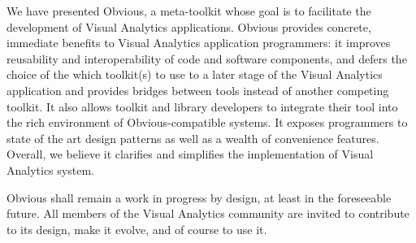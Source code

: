 
We have presented Obvious, a meta-toolkit whose goal is to facilitate
the development of Visual Analytics applications.
Obvious provides concrete, immediate benefits to Visual Analytics
application programmers: it improves reusability and interoperability
of code and software components, and defers the choice of the which
toolkit(s) to use to a later stage of the Visual Analytics application
and provides bridges between tools instead of another competing
toolkit.  It also allows toolkit and library developers to integrate
their tool into the rich environment of Obvious-compatible systems.
It exposes programmers to state of the art design patterns as well as
a wealth of convenience features.  Overall, we believe it clarifies
and simplifies the implementation of Visual Analytics system.

Obvious shall remain a work in progress by design, at least in the
foreseeable future.  All members of the Visual Analytics community are
invited to contribute to its design, make it evolve, and of course to
use it.  
